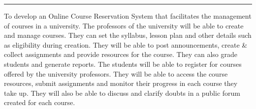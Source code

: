 \documentclass[12pt, a4]{article}
\begin{document}
\maketitle

\hrule
\begin{flushleft}
To develop an Online Course Reservation System that facilitates the management of courses in a university.
The professors of the university will be able to create and manage courses. They can set the syllabus, lesson plan and other details such as eligibility during creation. They will be able to post announcements, create & collect assignments and provide resources for the course. They can also grade students and generate reports.
The students will be able to register for courses offered by the university professors. They will be able to access the course resources, submit assignments and monitor their progress in each course they take up. They will also be able to discuss and clarify doubts in a public forum created for each course.
\end{flushleft}
\end{document}
